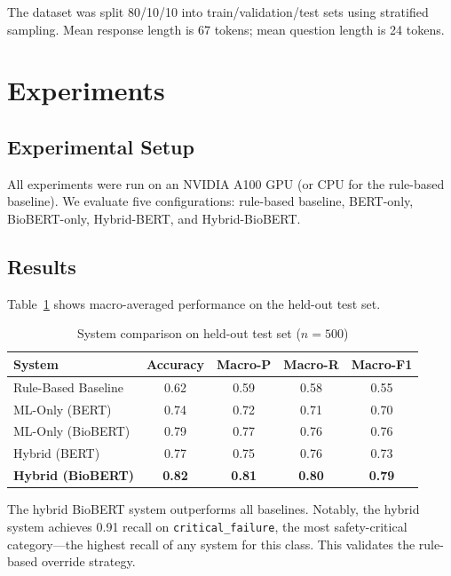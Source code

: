 \documentclass[11pt,a4paper]{article}
\begin{document}
\noindent The dataset was split 80/10/10 into train/validation/test sets using stratified sampling. Mean response length is 67 tokens; mean question length is 24 tokens.

\section{Experiments}
\label{sec:experiments}

\subsection{Experimental Setup}

All experiments were run on an NVIDIA A100 GPU (or CPU for the rule-based baseline). We evaluate five configurations: rule-based baseline, BERT-only, BioBERT-only, Hybrid-BERT, and Hybrid-BioBERT.

\subsection{Results}

Table~\ref{tab:results} shows macro-averaged performance on the held-out test set.

\begin{table}[h]
\centering
\caption{System comparison on held-out test set ($n = 500$)}
\label{tab:results}
\begin{tabular}{lcccc}
\toprule
\textbf{System} & \textbf{Accuracy} & \textbf{Macro-P} & \textbf{Macro-R} & \textbf{Macro-F1} \\
\midrule
Rule-Based Baseline    & 0.62 & 0.59 & 0.58 & 0.55 \\
ML-Only (BERT)         & 0.74 & 0.72 & 0.71 & 0.70 \\
ML-Only (BioBERT)      & 0.79 & 0.77 & 0.76 & 0.76 \\
Hybrid (BERT)          & 0.77 & 0.75 & 0.76 & 0.73 \\
\textbf{Hybrid (BioBERT)} & \textbf{0.82} & \textbf{0.81} & \textbf{0.80} & \textbf{0.79} \\
\bottomrule
\end{tabular}
\end{table}

\noindent The hybrid BioBERT system outperforms all baselines. Notably, the hybrid system achieves 0.91 recall on \texttt{critical\_failure}, the most safety-critical category—the highest recall of any system for this class. This validates the rule-based override strategy.
\end{document}
